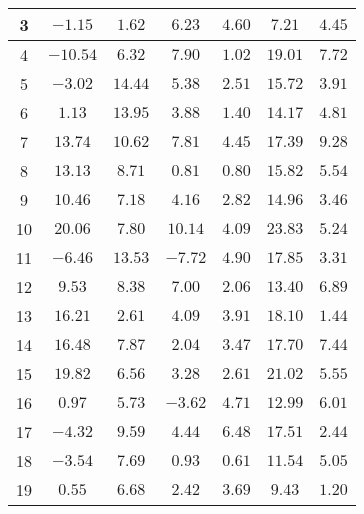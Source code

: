 \begin{table}[H]
\begin{tabular}{|c|c|c|c|c|c|c|}
                        3    &  $-1.15$   &  $1.62$   &   $6.23$    &   $4.60$  &  $7.21$   & $4.45$        \\ \hline
                        4    &  $-10.54$  &  $6.32$   &   $7.90$    &   $1.02$  &  $19.01$  & $7.72$  \\ \hline
                        5    &  $-3.02$   &  $14.44$  &   $5.38$    &   $2.51$  &  $15.72$  & $3.91$   \\ \hline
                        6    &  $1.13$    &  $13.95$  &   $3.88$    &   $1.40$  &  $14.17$  & $4.81$   \\ \hline
                        7    &  $13.74$   &  $10.62$  &   $7.81$    &   $4.45$  &  $17.39$  & $9.28$   \\ \hline
                        8    &  $13.13$   &  $8.71$   &   $0.81$    &   $0.80$  &  $15.82$  & $5.54$   \\ \hline
                        9    &  $10.46$   &  $7.18$   &   $4.16$    &   $2.82$  &  $14.96$  & $3.46$   \\ \hline
                        10   &  $20.06$   &  $7.80$   &   $10.14$   &   $4.09$  &  $23.83$  & $5.24$   \\ \hline
                        11   &  $-6.46$   &  $13.53$  &   $-7.72$   &   $4.90$  &  $17.85$  & $3.31$   \\ \hline
                        12   &  $9.53$    &  $8.38$   &   $7.00$    &   $2.06$  &  $13.40$  & $6.89$   \\ \hline
                        13   &  $16.21$   &  $2.61$   &   $4.09$    &   $3.91$  &  $18.10$  & $1.44$   \\ \hline
                        14   &  $16.48$   &  $7.87$   &   $2.04$    &   $3.47$  &  $17.70$  & $7.44$   \\ \hline
                        15   &  $19.82$   &  $6.56$   &   $3.28$    &   $2.61$  &  $21.02$  & $5.55$   \\ \hline
                        16   &  $0.97$    &  $5.73$   &   $-3.62$   &   $4.71$  &  $12.99$  & $6.01$   \\ \hline
                        17   &  $-4.32$   &  $9.59$   &   $4.44$    &   $6.48$  &  $17.51$  & $2.44$   \\ \hline
                        18   &  $-3.54$   &  $7.69$   &   $0.93$    &   $0.61$  &  $11.54$  & $5.05$   \\ \hline
                        19   &  $0.55$    &  $6.68$   &   $2.42$    &   $3.69$  &  $9.43$   & $1.20$   \\ \hline

\end{tabular}
\end{table}
